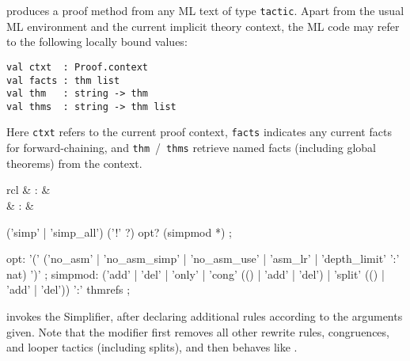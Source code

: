 \begin{isabellebody}
\begin{isamarkuptext}
\begin{descr}
  \item [\mbox{\isa{tactic}}~\isa{{\isachardoublequote}text{\isachardoublequote}}] produces a proof method from
  any ML text of type \verb|tactic|.  Apart from the usual ML
  environment and the current implicit theory context, the ML code may
  refer to the following locally bound values:

{\footnotesize\begin{verbatim}
val ctxt  : Proof.context
val facts : thm list
val thm   : string -> thm
val thms  : string -> thm list
\end{verbatim}}

  Here \verb|ctxt| refers to the current proof context, \verb|facts| indicates any current facts for forward-chaining, and \verb|thm|~/~\verb|thms| retrieve named facts (including global theorems)
  from the context.

  \end{descr}%
\end{isamarkuptext}%
\isamarkuptrue%
%
\isamarkuptrue%
%
\isamarkuptrue%
%
\begin{isamarkuptext}%
\begin{matharray}{rcl}
    \mbox{} & : & \isarmeth \\
    \mbox{} & : & \isarmeth \\
  \end{matharray}

  \begin{rail}
    ('simp' | 'simp\_all') ('!' ?) opt? (simpmod *)
    ;

    opt: '(' ('no\_asm' | 'no\_asm\_simp' | 'no\_asm\_use' | 'asm\_lr' | 'depth\_limit' ':' nat) ')'
    ;
    simpmod: ('add' | 'del' | 'only' | 'cong' (() | 'add' | 'del') |
      'split' (() | 'add' | 'del')) ':' thmrefs
    ;
  \end{rail}

  \begin{descr}

  \item [\mbox{\isa{simp}}] invokes the Simplifier, after declaring
  additional rules according to the arguments given.  Note that the
   modifier first removes all other rewrite rules,
  congruences, and looper tactics (including splits), and then behaves
  like .


\end{descr}
\end{isamarkuptext}
\end{isabellebody}
